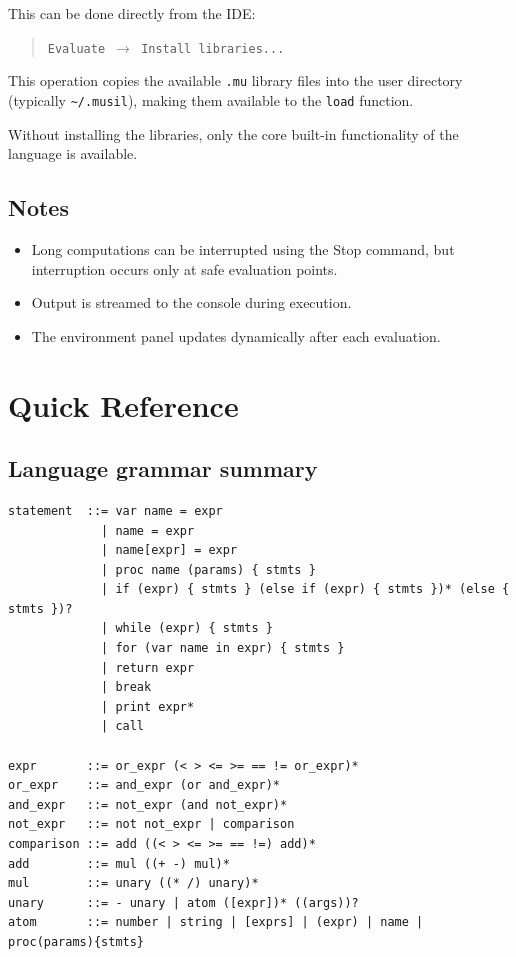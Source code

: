 \documentclass[11pt,a4paper]{article}
\begin{document}
This can be done directly from the IDE:

\begin{quote}
\texttt{Evaluate $\rightarrow$ Install libraries...}
\end{quote}

This operation copies the available \texttt{.mu} library files into the user directory (typically \texttt{\textasciitilde{}/.musil}), making them available to the \texttt{load} function.

Without installing the libraries, only the core built-in functionality of the language is available.

\subsection{Notes}

\begin{itemize}
    \item Long computations can be interrupted using the Stop command, but interruption occurs only at safe evaluation points.
    \item Output is streamed to the console during execution.
    \item The environment panel updates dynamically after each evaluation.
\end{itemize}

\section{Quick Reference}
\label{sec:quickref}

\subsection*{Language grammar summary}

\begin{lstlisting}[numbers=none]
statement  ::= var name = expr
             | name = expr
             | name[expr] = expr
             | proc name (params) { stmts }
             | if (expr) { stmts } (else if (expr) { stmts })* (else { stmts })?
             | while (expr) { stmts }
             | for (var name in expr) { stmts }
             | return expr
             | break
             | print expr*
             | call

expr       ::= or_expr (< > <= >= == != or_expr)*
or_expr    ::= and_expr (or and_expr)*
and_expr   ::= not_expr (and not_expr)*
not_expr   ::= not not_expr | comparison
comparison ::= add ((< > <= >= == !=) add)*
add        ::= mul ((+ -) mul)*
mul        ::= unary ((* /) unary)*
unary      ::= - unary | atom ([expr])* ((args))?
atom       ::= number | string | [exprs] | (expr) | name | proc(params){stmts}
\end{lstlisting}
\end{document}
